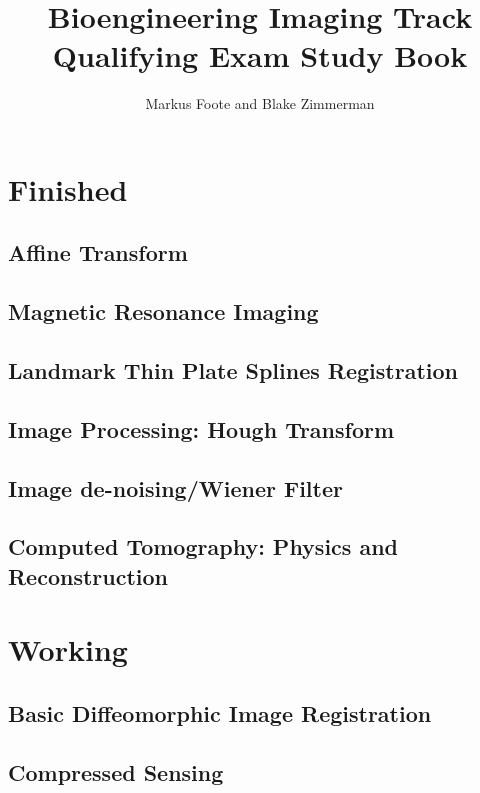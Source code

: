 \documentclass{report}
\title{Bioengineering Imaging Track Qualifying Exam Study Book}
\author{Markus Foote and Blake Zimmerman}
\begin{document}
	\maketitle
	\setcounter{tocdepth}{1} %
	\tableofcontents
	\part{Finished}
	\chapter{Affine Transform}
	
	
	\chapter{Magnetic Resonance Imaging}
	
	\chapter{Landmark Thin Plate Splines Registration}
	
	\chapter{Image Processing: Hough Transform}
	
	\chapter{Image de-noising/Wiener Filter}
	
	\chapter{Computed Tomography: Physics and Reconstruction}
	
	\part{Working}
	
	\chapter{Basic Diffeomorphic Image Registration}
	
	\chapter{Compressed Sensing}

	
	
	
	
	
	
		
\end{document}
